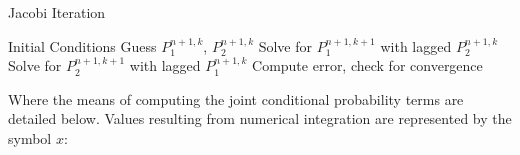 \documentclass[12pt,a4paper,pagesize=pdftex]{scrartcl}
\begin{document}
\begin{algorithm}[H]
    \caption*{Jacobi Iteration}
    \begin{algorithmic}
        \REQUIRE Initial Conditions
            \STATE Guess \(P_1^{n+1,k}\), \(P_2^{n+1, k}\)
                \STATE Solve for \(P_1^{n+1, k+1}\) with lagged \(P_2^{n+1,k}\)
                \STATE Solve for \(P_2^{n+1, k+1}\) with lagged \(P_1^{n+1,k}\)
                \STATE Compute error, check for convergence
            \ENDWHILE
        \ENDFOR
    \end{algorithmic}
\end{algorithm}

Where the means of computing the joint conditional probability terms are detailed below. Values resulting from numerical integration are represented by the symbol \(x\):
\end{document}
